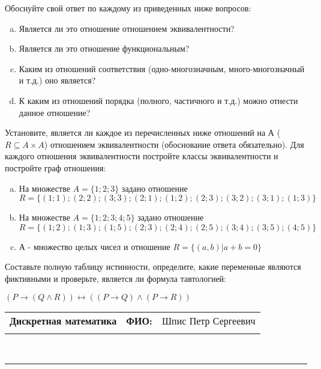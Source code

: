 \documentclass[10pt]{exam}
\newcommand{\class}{Дискретная математика}
\newcommand{\examdate}{}
\begin{document}
\begin{questions}
Обоснуйте свой ответ по каждому из приведенных ниже вопросов:
\begin{enumerate} [a)]\setcounter{enumi}{0}
    \item Является ли это отношение отношением эквивалентности?
    \item Является ли это отношение функциональным?
    \item Каким из отношений соответствия (одно-многозначным, много-многозначный и т.д.) оно является?
    \item К каким из отношений порядка (полного, частичного и т.д.) можно отнести данное отношение?
\end{enumerate}
\question
Установите, является ли каждое из перечисленных ниже отношений на А ($R \subseteq A \times A$) отношением эквивалентности (обоснование ответа обязательно). Для каждого отношения эквивалентности постройте классы 
эквивалентности и постройте граф отношения:
\begin{enumerate} [a)]\setcounter{enumi}{0}
\item На множестве $A = \{1; 2; 3\}$ задано отношение $R = \{(1; 1); (2; 2); (3; 3); (2; 1); (1; 2); (2; 3); (3; 2); (3; 1); (1; 3)\}$
\item На множестве $A = \{1; 2; 3; 4; 5\}$ задано отношение $R = \{(1; 2); (1; 3); (1; 5); (2; 3); (2; 4); (2; 5); (3; 4); (3; 5); (4; 5)\}$
\item А - множество целых чисел и отношение $R = \{(a,b)|a + b = 0\}$
\end{enumerate}\question Составьте полную таблицу истинности, определите, какие переменные являются фиктивными и проверьте, является ли формула тавтологией:

$(P \rightarrow (Q \land R)) \leftrightarrow ((P \rightarrow Q) \land (P \rightarrow R))$

\end{questions}
\newpage
\begin{flushright}
\begin{tabular}{p{2.8in} r l}
\textbf{\class} & \textbf{ФИО:} &Шпис Петр Сергеевич
\\

\textbf{\examdate} &&\\
\end{tabular}\\
\end{flushright}
\rule[1ex]{\textwidth}{.1pt}
\end{document}
